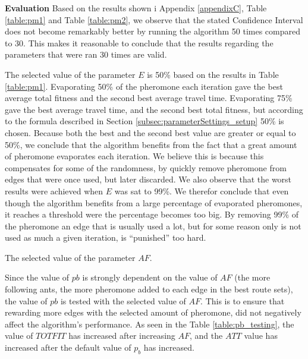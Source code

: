 \textbf{Evaluation}
\newline
Based on the results shown i Appendix \ref{appendixC}, Table \vref{table:pm1} and Table \vref{table:pm2}, we observe that the stated Confidence Interval does not become remarkably better by running the algorithm 50 times compared to 30. This makes it reasonable to conclude that the results regarding the parameters that were ran 30 times are valid. 
\newline

The selected value of the parameter $E$ is 50\% based on the results in Table \vref{table:pm1}. Evaporating 50\% of the pheromone each iteration gave the best average total fitness and the second best average travel time. Evaporating 75\% gave the best average travel time, and the second best total fitness, but according to the formula described in Section \vref{subsec:parameterSettings_setup} 50\% is chosen. Because both the best and the second best value are greater or equal to 50\%, we conclude that the algorithm benefits from the fact that a great amount of pheromone evaporates each iteration. We believe this is because this compensates for some of the randomness, by quickly remove pheromone from edges that were once used, but later discarded. We also observe that the worst results were achieved when $E$ was sat to 99\%. We therefor conclude that even though the algorithm benefits from a large percentage of evaporated pheromones, it reaches a threshold were the percentage becomes too big. By removing 99\% of the pheromone an edge that is usually used a lot, but for some reason only is not used as much a given iteration, is ``punished'' too hard.

The selected value of the parameter $AF$.

Since the value of $pb$ is strongly dependent on the value of $AF$ (the more following ants, the more pheromone added to each edge in the best route sets), the value of $pb$ is tested with the selected value of $AF$. This is to ensure that rewarding more edges with the selected amount of pheromone, did not negatively affect the algorithm's performance. As seen in the Table \vref{table:pb_testing}, the value of $TOTFIT$ has increased after increasing $AF$, and the $ATT$ value has increased after the default value of $p_b$ has increased. 


